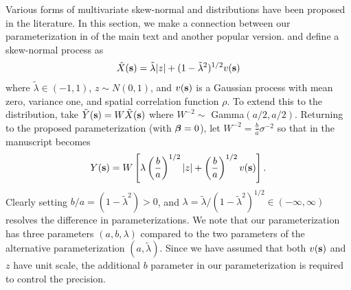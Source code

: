 \label{sta:otherparams}
Various forms of multivariate skew-normal and \skewt distributions have been proposed in the literature.
In this section, we make a connection between our parameterization in  of the main text and another popular version.
\citet{Azzalini2014} and \citet{Beranger2016} define a skew-normal process as
\begin{align}
  \tilde{X}(\mathbf{s}) = \tilde{\lambda}|z| + (1 - \tilde{\lambda}^2)^{1 / 2} v(\mathbf{s})
\end{align}
where $\tilde{\lambda} \in (-1, 1)$, $z \sim N(0, 1)$, and $v(\mathbf{s})$ is a Gaussian process with mean zero, variance one, and spatial correlation function $\rho$.
To extend this to the \skewt distribution, \citet{Azzalini2003} take $\tilde{Y}(\mathbf{s}) = W\tilde{X}(\mathbf{s})$ where $W^{-2} \sim $ Gamma$(a / 2, a / 2)$.
Returning to the proposed parameterization (with $\mbox{\boldmath $\beta$} = 0$), let $W^{-2} = \frac{b}{a}\sigma^{-2}$ so that  in the manuscript becomes
\begin{align}
  Y(\mathbf{s}) = W \left[ \lambda \left(\frac{b}{a}\right)^{1 / 2} |z| + \left(\frac{b}{a}\right)^{1 / 2} v(\mathbf{s}) \right].
\end{align}
Clearly setting $b / a = (1 - \tilde{\lambda}^2) > 0$, and $\lambda = \tilde{\lambda} / (1 - \tilde{\lambda}^2)^{1 / 2} \in (-\infty, \infty)$ resolves the difference in parameterizations.
We note that our parameterization has three parameters $(a, b, \lambda)$ compared to the two parameters of the alternative parameterization $(a, \tilde{\lambda})$.
Since we have assumed that both $v(\mathbf{s})$ and $z$ have unit scale, the additional $b$ parameter in our parameterization is required to control the precision.

